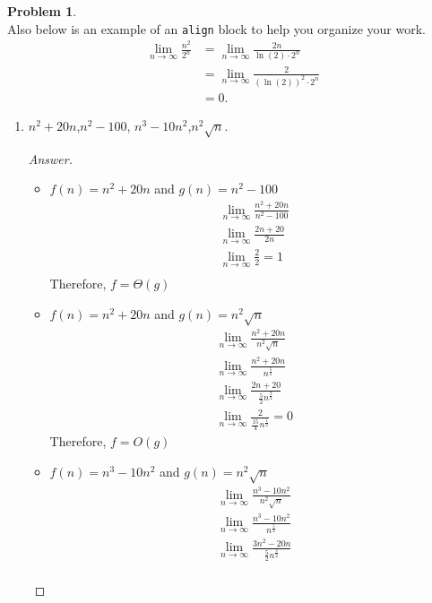 \documentclass[11pt]{article}
\theoremstyle{definition}
\theoremstyle{definition}
\newtheorem{required}{Problem}
\theoremstyle{definition}
\begin{document}
\begin{required}
\noindent \\ Also below is an example of an \texttt{align} block to help you organize your work.
\begin{align*}
\lim_{n \to \infty} \frac{n^{2}}{2^{n}} &= \lim_{n \to \infty} \frac{2n}{\ln(2) \cdot 2^{n}} \\
&= \lim_{n \to \infty} \frac{2}{(\ln(2))^{2} \cdot 2^{n}} \\
&= 0.
\end{align*}
\newpage
\begin{enumerate} [label=(\alph*)]
\subsection{Problem 1\ref{1a}}
    \item \label{1a} $ n^2+20n$,\qquad  $ n^2-100$, \qquad $n^3-10n^2$,\qquad  $n^2\sqrt{n}$.
    \begin{proof}[Answer] $ $ 
    \begin{itemize}
        \item  $f(n) = n^2 + 20n$ and $g(n) = n^2-100 $
        \begin{align*}
            \lim_{n \to \infty} \frac{n^2+20n}{n^{2}-100} \\
            \lim_{n \to \infty} \frac{2n+20}{2n}  \\
            \lim_{n \to \infty} \frac{2}{2}= 1 \\
        \end{align*}
        Therefore, $f=\Theta(g)$
        \item  $f(n) = n^2 + 20n$ and $g(n) = n^2\sqrt{n} $
        \begin{align*}
            \lim_{n \to \infty} \frac{n^2+20n}{n^{2}\sqrt{n}} \\
            \lim_{n \to \infty} \frac{n^2+20n}{n^{\frac{5}{2}}} \\
            \lim_{n \to \infty} \frac{2n+20}{\frac{5}{2}n^{\frac{3}{2}}} \\
            \lim_{n \to \infty} \frac{2}{\frac{15}{4}n^{\frac{1}{2}}} = 0
        \end{align*}
        Therefore, $f=O(g)$
        \item $f(n) = n^3-10n^2 $ and $g(n) = n^2\sqrt{n} $
        \begin{align*}
        \lim_{n \to \infty} \frac{n^3-10n^2}{n^{2}\sqrt{n}} \\
        \lim_{n \to \infty} \frac{n^3-10n^2}{n^{\frac{5}{2}}} \\
        \lim_{n \to \infty} \frac{3n^2-20n}{\frac{5}{2}n^{\frac{3}{2}}} \\

\end{align*}
\end{itemize}
\end{proof}
\end{enumerate}
\end{required}
\end{document}
